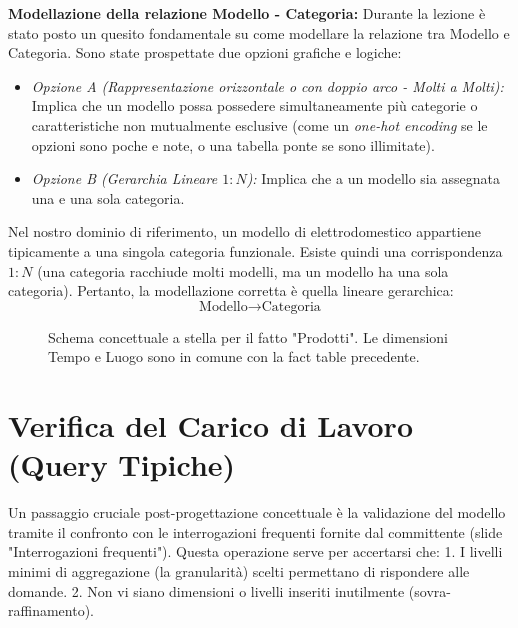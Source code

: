 \textbf{Modellazione della relazione Modello - Categoria:}
Durante la lezione è stato posto un quesito fondamentale su come modellare la relazione tra Modello e Categoria. Sono state prospettate due opzioni grafiche e logiche:
\begin{itemize}
    \item \textit{Opzione A (Rappresentazione orizzontale o con doppio arco - Molti a Molti):} Implica che un modello possa possedere simultaneamente più categorie o caratteristiche non mutualmente esclusive (come un \textit{one-hot encoding} se le opzioni sono poche e note, o una tabella ponte se sono illimitate).
    \item \textit{Opzione B (Gerarchia Lineare $1:N$):} Implica che a un modello sia assegnata una e una sola categoria.
\end{itemize}
Nel nostro dominio di riferimento, un modello di elettrodomestico appartiene tipicamente a una singola categoria funzionale. Esiste quindi una corrispondenza $1:N$ (una categoria racchiude molti modelli, ma un modello ha una sola categoria). Pertanto, la modellazione corretta è quella lineare gerarchica:
\[\text{Modello} \rightarrow \text{Categoria}\]

\begin{figure}[H]
    \centering
    \caption{Schema concettuale a stella per il fatto "Prodotti". Le dimensioni Tempo e Luogo sono in comune con la fact table precedente.}
    \label{fig:star_schema_2}
\end{figure}

\section{Verifica del Carico di Lavoro (Query Tipiche)}

Un passaggio cruciale post-progettazione concettuale è la validazione del modello tramite il confronto con le interrogazioni frequenti fornite dal committente (slide "Interrogazioni frequenti"). Questa operazione serve per accertarsi che:
1. I livelli minimi di aggregazione (la granularità) scelti permettano di rispondere alle domande.
2. Non vi siano dimensioni o livelli inseriti inutilmente (sovra-raffinamento).

